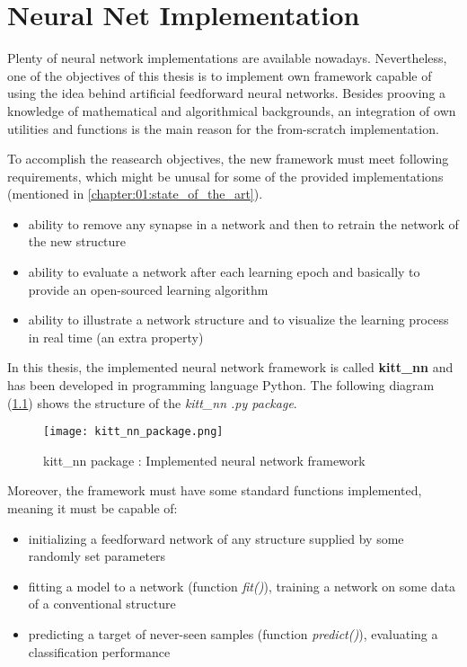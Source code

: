 \chapter{Neural Net Implementation} \label{chap:kitt_nn}
Plenty of neural network implementations are available nowadays. Nevertheless, one of the objectives of this thesis is to implement own framework capable of using the idea behind artificial feedforward neural networks. Besides prooving a knowledge of mathematical and algorithmical backgrounds, an integration of own utilities and functions is the main reason for the from-scratch implementation.

To accomplish the reasearch objectives, the new framework must meet following requirements, which might be unusal for some of the provided implementations (mentioned in \cref{chapter:01:state_of_the_art}).

\begin{itemize}
\item ability to remove any synapse in a network and then to retrain the network of the new structure
\item ability to evaluate a network after each learning epoch and basically to provide an open-sourced learning algorithm
\item ability to illustrate a network structure and to visualize the learning process in real time (an extra property)
\end{itemize}

In this thesis, the implemented neural network framework is called \textbf{kitt\_nn} and has been developed in programming language Python. The following diagram (\ref{img:kitt_nn_package}) shows the structure of the \textit{kitt\_nn .py package}.

\begin{figure}[H]
  \centering
  \texttt{[image: kitt\_nn\_package.png]}
  \caption{kitt\_nn package : Implemented neural network framework}
  \label{img:kitt_nn_package}
\end{figure}

Moreover, the framework must have some standard functions implemented, meaning it must be capable of:

\begin{itemize}
\item initializing a feedforward network of any structure supplied by some randomly set parameters
\item fitting a model to a network (function \textit{fit()}), training a network on some data of a conventional structure
\item predicting a target of never-seen samples (function \textit{predict()}), evaluating a classification performance
\end{itemize}


